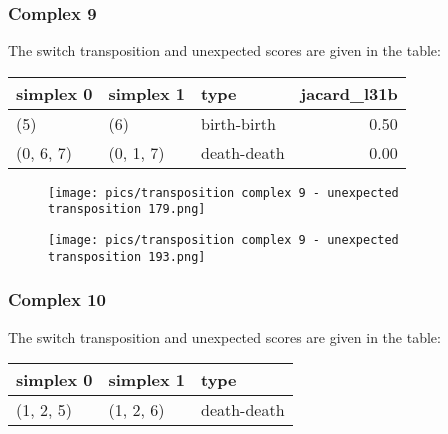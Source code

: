\documentclass{article}
\begin{document}
\subsubsection{Complex 9}
\par The switch transposition and unexpected scores are given in the table:
\begin{center}
\begin{tabular}{lllr}
\toprule
simplex 0 & simplex 1 & type & jacard\_l31b \\
\midrule
(5) & (6) & birth-birth & 0.50 \\
(0, 6, 7) & (0, 1, 7) & death-death & 0.00 \\
\bottomrule
\end{tabular}
\end{center}

\begin{figure}[ht]
\centering
\texttt{[image: pics/transposition complex 9 - unexpected transposition 179.png]}
\end{figure}


\begin{figure}[ht]
\centering
\texttt{[image: pics/transposition complex 9 - unexpected transposition 193.png]}
\end{figure}


\subsubsection{Complex 10}
\par The switch transposition and unexpected scores are given in the table:
\begin{center}
\begin{tabular}{lll}
\toprule
simplex 0 & simplex 1 & type \\
\midrule
(1, 2, 5) & (1, 2, 6) & death-death \\
\bottomrule
\end{tabular}
\end{center}
\end{document}
